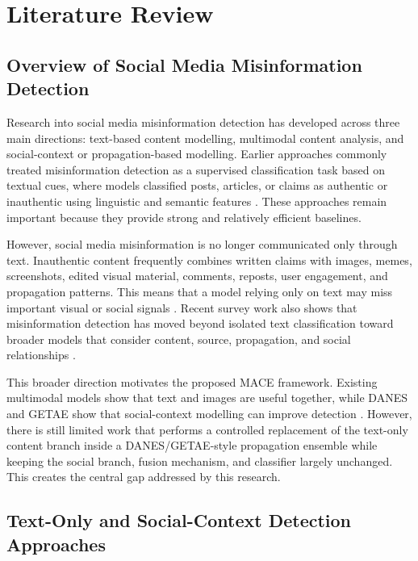 \section{Literature Review}

\subsection{Overview of Social Media Misinformation Detection}

Research into social media misinformation detection has developed across three main directions: text-based content modelling, multimodal content analysis, and social-context or propagation-based modelling. Earlier approaches commonly treated misinformation detection as a supervised classification task based on textual cues, where models classified posts, articles, or claims as authentic or inauthentic using linguistic and semantic features \citep{Wang2018,Song2021,truica2024danes}. These approaches remain important because they provide strong and relatively efficient baselines.

However, social media misinformation is no longer communicated only through text. Inauthentic content frequently combines written claims with images, memes, screenshots, edited visual material, comments, reposts, user engagement, and propagation patterns. This means that a model relying only on text may miss important visual or social signals \citep{Wang2018,Nakamura2020,Qian2021}. Recent survey work also shows that misinformation detection has moved beyond isolated text classification toward broader models that consider content, source, propagation, and social relationships \citep{emil2025autofakenews,phan2023graphsurvey,gong2023fakenewsdetectiongraphbased}.

This broader direction motivates the proposed MACE framework. Existing multimodal models show that text and images are useful together, while DANES and GETAE show that social-context modelling can improve detection \citep{Qian2021,truica2024danes,GETAE2025}. However, there is still limited work that performs a controlled replacement of the text-only content branch inside a DANES/GETAE-style propagation ensemble while keeping the social branch, fusion mechanism, and classifier largely unchanged. This creates the central gap addressed by this research.

\subsection{Text-Only and Social-Context Detection Approaches}

